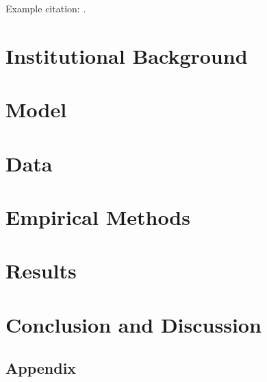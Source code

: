 \documentclass[12pt]{article}%
\begin{document}
Example citation: \citet{Kalnay1996}.

\section{Institutional Background} \label{sec:background}

\section{Model} \label{sec:model}

\section{Data} \label{sec:data}
 
\section{Empirical Methods} \label{sec:methods}

\section{Results} \label{sec:results}

\section{Conclusion and Discussion} \label{sec:conclusion}

\FloatBarrier
\newpage
\begin{singlespace}

{}
\end{singlespace}
\FloatBarrier
\newpage
\begin{Large}
\section*{Appendix}
\end{Large}

\setcounter{table}{0}
\setcounter{figure}{0}
\renewcommand{\thetable}{A\arabic{table}}
\renewcommand{\thefigure}{A\arabic{figure}}

\begin{appendices}
\end{appendices}
\end{document}
